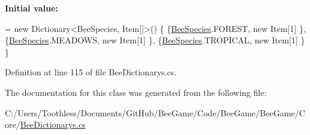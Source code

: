 {\bfseries Initial value\+:}
\begin{DoxyCode}
= \textcolor{keyword}{new} Dictionary<BeeSpecies, Item[]>()
        \{
            \{\hyperlink{namespace_bee_game_1_1_enums_aa2ead984825678d83c42d48f6382619c}{BeeSpecies}.FOREST, \textcolor{keyword}{new} Item[1] \},
            \{\hyperlink{namespace_bee_game_1_1_enums_aa2ead984825678d83c42d48f6382619c}{BeeSpecies}.MEADOWS, \textcolor{keyword}{new} Item[1] \},
            \{\hyperlink{namespace_bee_game_1_1_enums_aa2ead984825678d83c42d48f6382619c}{BeeSpecies}.TROPICAL, \textcolor{keyword}{new} Item[1] \}
        \}
\end{DoxyCode}


Definition at line 115 of file Bee\+Dictionarys.\+cs.



The documentation for this class was generated from the following file\+:\begin{DoxyCompactItemize}
\item 
C\+:/\+Users/\+Toothless/\+Documents/\+Git\+Hub/\+Bee\+Game/\+Code/\+Bee\+Game/\+Bee\+Game/\+Core/\hyperlink{_bee_dictionarys_8cs}{Bee\+Dictionarys.\+cs}\end{DoxyCompactItemize}
